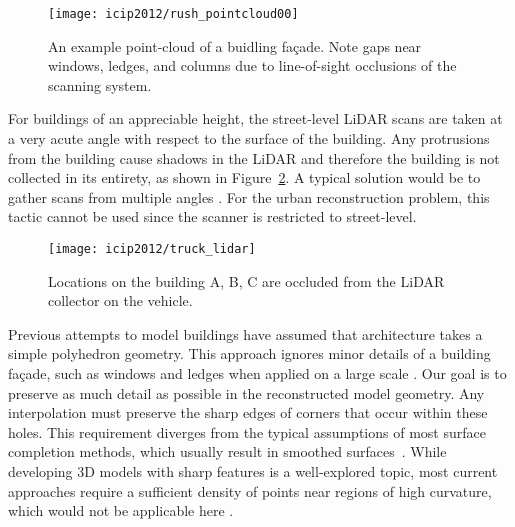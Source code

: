 \documentclass[12pt,onecolumn,oneside]{book}
\begin{document}
\begin{figure}
	\begin{minipage}[b]{1.0\linewidth}
	  \centering
	  \centerline{\texttt{[image: icip2012/rush\_pointcloud00]}}
	\end{minipage}

	\caption[An example point-cloud of a building fa\c{c}ade.]{An example point-cloud of a buidling fa\c{c}ade. Note gaps near windows, ledges, and columns due to line-of-sight occlusions of the scanning system.}
	\label{fig:rush_points}
\end{figure}

For buildings of an appreciable height, the street-level LiDAR scans are taken at a very acute angle with respect to the surface of the building.  Any protrusions from the building cause shadows in the LiDAR and therefore the building is not collected in its entirety, as shown in Figure~\ref{fig:truck_lidar}.  A typical solution would be to gather scans from multiple angles \cite{Tang10, Curless96}.  For the urban reconstruction problem, this tactic cannot be used since the scanner is restricted to street-level.

\begin{figure}[t]

\begin{minipage}[b]{1.0\linewidth}
  \centering
  \centerline{\texttt{[image: icip2012/truck\_lidar]}}
\end{minipage}

\caption[Scanning building fa\c{c}ades from a vehicle.]{Locations on the building A, B, C are occluded from the LiDAR collector on the vehicle.}
\label{fig:truck_lidar}

\end{figure}

Previous attempts to model buildings have assumed that architecture takes a simple polyhedron geometry. This approach ignores minor details of a building fa\c{c}ade, such as windows and ledges when applied on a large scale \cite{Chauve10, Chen07}.  Our goal is to preserve as much detail as possible in the reconstructed model geometry.  Any interpolation must preserve the sharp edges of corners that occur within these holes.  This requirement diverges from the typical assumptions of most surface completion methods, which usually result in smoothed surfaces~\cite{Poisson, Kawai11}.  While developing 3D models with sharp features is a well-explored topic, most current approaches require a sufficient density of points near regions of high curvature, which would not be applicable here \cite{Bernardini04, Mhatre06}.  
\end{document}
